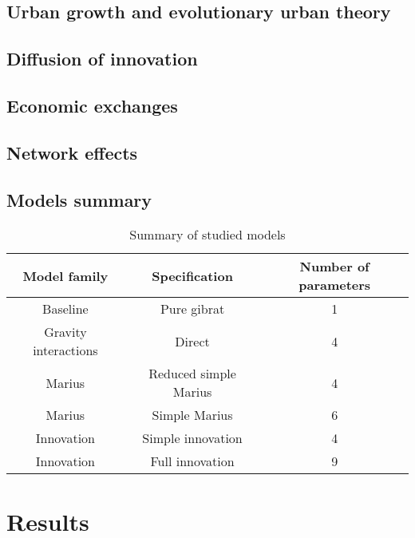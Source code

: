 \documentclass[alpha-refs]{wiley-article}
\begin{document}
\subsection{Urban growth and evolutionary urban theory}


\subsection{Diffusion of innovation}


\subsection{Economic exchanges}



\subsection{Network effects}





\subsection{Models summary}



\begin{table}
	\caption{Summary of studied models}
	\begin{tabular}{|c|c|c}
		Model family & Specification & Number of parameters \\\hline
		Baseline & Pure gibrat & 1 \\
		Gravity interactions & Direct & 4 \\
		Marius & Reduced simple Marius & 4 \\
		Marius & Simple Marius & 6 \\
		Innovation & Simple innovation & 4 \\
		Innovation & Full innovation & 9 \\
	\end{tabular}
	
\end{table}



\section{Results}
\end{document}
